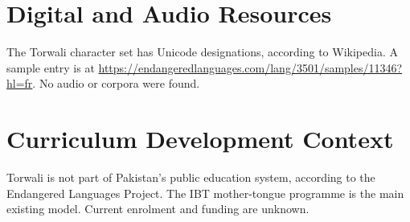 \documentclass[12pt]{article}
\begin{document}
\section{Digital and Audio Resources}
The Torwali character set has Unicode designations, according to Wikipedia. A sample entry is at \url{https://endangeredlanguages.com/lang/3501/samples/11346?hl=fr}. No audio or corpora were found.
\section{Curriculum Development Context}
Torwali is not part of Pakistan's public education system, according to the Endangered Languages Project. The IBT mother-tongue programme is the main existing model. Current enrolment and funding are unknown.
\end{document}
